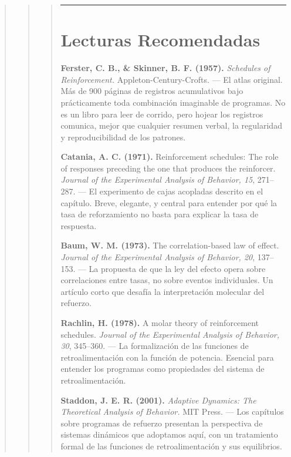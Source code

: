 \documentclass[
  letterpaper,
  DIV=11,
  numbers=noendperiod]{scrreprt}
\begin{document}
\begin{tcolorbox}[enhanced jigsaw, toprule=.15mm, arc=.35mm, colback=white, opacityback=0, colframe=quarto-callout-note-color-frame, breakable, rightrule=.15mm, left=2mm, leftrule=.75mm, bottomrule=.15mm]
\begin{quote}
\begin{quote}
\begin{quote}
\begin{center}\rule{0.5\linewidth}{0.5pt}\end{center}

\section{Lecturas Recomendadas}\label{lecturas-recomendadas-5}

\textbf{Ferster, C. B., \& Skinner, B. F. (1957).} \emph{Schedules of
Reinforcement.} Appleton-Century-Crofts. --- El atlas original. Más de
900 páginas de registros acumulativos bajo prácticamente toda
combinación imaginable de programas. No es un libro para leer de
corrido, pero hojear los registros comunica, mejor que cualquier resumen
verbal, la regularidad y reproducibilidad de los patrones.

\textbf{Catania, A. C. (1971).} Reinforcement schedules: The role of
responses preceding the one that produces the reinforcer. \emph{Journal
of the Experimental Analysis of Behavior, 15}, 271--287. --- El
experimento de cajas acopladas descrito en el capítulo. Breve, elegante,
y central para entender por qué la tasa de reforzamiento no basta para
explicar la tasa de respuesta.

\textbf{Baum, W. M. (1973).} The correlation-based law of effect.
\emph{Journal of the Experimental Analysis of Behavior, 20}, 137--153.
--- La propuesta de que la ley del efecto opera sobre correlaciones
entre tasas, no sobre eventos individuales. Un artículo corto que
desafía la interpretación molecular del refuerzo.

\textbf{Rachlin, H. (1978).} A molar theory of reinforcement schedules.
\emph{Journal of the Experimental Analysis of Behavior, 30}, 345--360.
--- La formalización de las funciones de retroalimentación con la
función de potencia. Esencial para entender los programas como
propiedades del sistema de retroalimentación.

\textbf{Staddon, J. E. R. (2001).} \emph{Adaptive Dynamics: The
Theoretical Analysis of Behavior.} MIT Press. --- Los capítulos sobre
programas de refuerzo presentan la perspectiva de sistemas dinámicos que
adoptamos aquí, con un tratamiento formal de las funciones de
retroalimentación y sus equilibrios.
\end{quote}
\end{quote}
\end{quote}

\end{tcolorbox}
\end{document}
